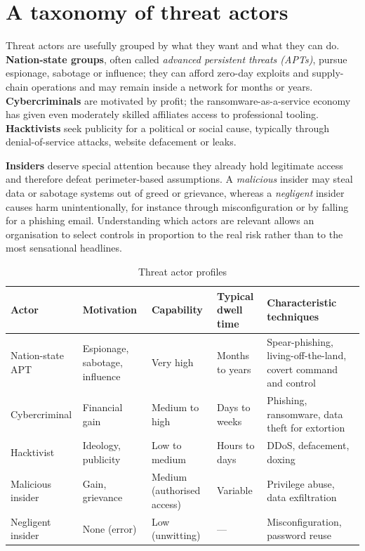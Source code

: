 \section{A taxonomy of threat actors}\label{sec:3.1}
Threat actors are usefully grouped by what they want and what they can do. \textbf{Nation-state groups}, often called \emph{advanced persistent threats (APTs)}, pursue espionage, sabotage or influence; they can afford zero-day exploits and supply-chain operations and may remain inside a network for months or years. \textbf{Cybercriminals} are motivated by profit; the ransomware-as-a-service economy has given even moderately skilled affiliates access to professional tooling. \textbf{Hacktivists} seek publicity for a political or social cause, typically through denial-of-service attacks, website defacement or leaks.

\textbf{Insiders} deserve special attention because they already hold legitimate access and therefore defeat perimeter-based assumptions. A \emph{malicious} insider may steal data or sabotage systems out of greed or grievance, whereas a \emph{negligent} insider causes harm unintentionally, for instance through misconfiguration or by falling for a phishing email. Understanding which actors are relevant allows an organisation to select controls in proportion to the real risk rather than to the most sensational headlines.

\begin{table}[htbp]
  \centering\small
  \caption{Threat actor profiles}
  \begin{tabularx}{\linewidth}{>{\raggedright\arraybackslash}X >{\raggedright\arraybackslash}X >{\raggedright\arraybackslash}X >{\raggedright\arraybackslash}X >{\raggedright\arraybackslash}X}
    \toprule
    \textbf{Actor} & \textbf{Motivation} & \textbf{Capability} & \textbf{Typical dwell time} & \textbf{Characteristic techniques} \\
    \midrule
    Nation-state APT & Espionage, sabotage, influence & Very high & Months to years & Spear-phishing, living-off-the-land, covert command and control \\
    Cybercriminal & Financial gain & Medium to high & Days to weeks & Phishing, ransomware, data theft for extortion \\
    Hacktivist & Ideology, publicity & Low to medium & Hours to days & DDoS, defacement, doxing \\
    Malicious insider & Gain, grievance & Medium (authorised access) & Variable & Privilege abuse, data exfiltration \\
    Negligent insider & None (error) & Low (unwitting) & — & Misconfiguration, password reuse \\
    \bottomrule
  \end{tabularx}
\end{table}

